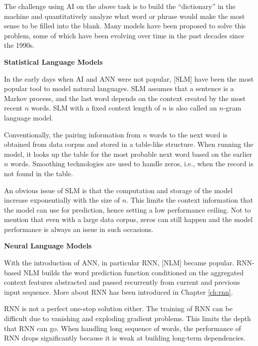 The challenge using AI on the above task is to build the ``dictionary'' in the machine and quantitatively analyze what word or phrase would make the most sense to be filled into the blank. Many models have been proposed to solve this problem, some of which have been evolving over time in the past decades since the 1990s.

\vspace{0.1in}
\noindent \textbf{Statistical Language Models}
\vspace{0.1in}

In the early days when AI and ANN were not popular, [SLM] have been the most popular tool to model natural languages. SLM assumes that a sentence is a Markov process, and the last word depends on the context created by the most recent $n$ words. SLM with a fixed context length of $n$ is also called an $n$-gram language model.

Conventionally, the pairing information from $n$ words to the next word is obtained from data corpus and stored in a table-like structure. When running the model, it looks up the table for the most probable next word based on the earlier $n$ words. Smoothing technologies are used to handle zeros, i.e., when the record is not found in the table.

An obvious issue of SLM is that the computation and storage of the model increase exponentially with the size of $n$. This limits the context information that the model can use for prediction, hence setting a low performance ceiling. Not to mention that even with a large data corpus, zeros can still happen and the model performance is always an issue in such occasions.

\vspace{0.1in}
\noindent \textbf{Neural Language Models}
\vspace{0.1in}

With the introduction of ANN, in particular RNN, [NLM] became popular. RNN-based NLM builds the word prediction function conditioned on the aggregated context features abstracted and passed recurrently from current and previous input sequence. More about RNN has been introduced in Chapter \ref{ch:rnn}.

RNN is not a perfect one-stop solution either. The training of RNN can be difficult due to vanishing and exploding gradient problems. This limits the depth that RNN can go. When handling long sequence of words, the performance of RNN drops significantly because it is weak at building long-term dependencies.

